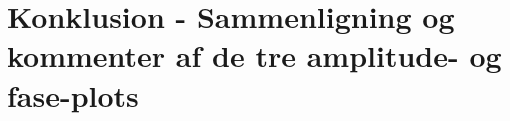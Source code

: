 \section{Konklusion - Sammenligning og kommenter af de tre amplitude- og fase-plots}\label{sec:spm6}

